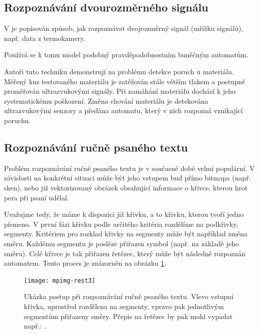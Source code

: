 \documentclass[a4paper,10pt]{article}
\begin{document}
\subsection{Rozpoznávání dvourozměrného signálu}
V \cite{Jin+-WavBasFeaExtUsPrFiStAuPatCla} je popisován způsob, jak rozpoznávat dvojrozměrný signál (mřížku signálů), např. data z termokamery.

Používá se k tomu model podobný pravděpodobnostním buněčným automatům. 

Autoři tuto techniku demonstrují na problému detekce poruch u materiálu. Měřený kus testovaného materiálu je zatěžován stále větším tlakem a postupně proměřován ultrazvukovými signály. Při namáhání materiálu dochází k jeho systematickému poškození. Změna chování materiálu je detekována ultrazvukovými senzory a předána automatu, který v nich rozpozná vznikající poruchu.

\subsection{Rozpoznávání ručně psaného textu} \label{subs:RecHandWrit}
Problém rozpoznávání ručně psaného textu je v současné době velmi populární. V závislosti na konkrétní situaci může být jeho vstupem buď přímo bitmapa (např. sken), nebo již vektorizovaný obrázek obsahující informace o křivce, kterou hrot pera při psaní udělal.

Uvažujme tedy, že máme k dispozici již křivku, a to křivku, kterou tvoří jedno písmeno. V první fázi křivku podle určitého kritéria rozdělíme na podkřivky, segmenty. Kritériem pro rozklad křivky na segmenty může být například změna směru. Každému segmentu je posléze přiřazen symbol (např. na základě jeho směru). Celé křivce je tak přiřazen řetězec, který může být následně rozpoznán automatem. Tento proces je znázorněn na obrázku \ref{img:HandWritEx}.

\begin{figure}
 \texttt{[image: mpimg-rest3]}
 
 \caption[Ukázka postupu při rozpoznávání ručně psaného textu]{Ukázka postup při rozpoznávání ručně psaného textu. Vlevo vstupní křivka, uprostřed rozdělena na segmenty, vpravo pak jednotlivým segmentům přiřazeny směry. Přepis na řetězec by pak mohl vypadat např.:       .}
 \label{img:HandWritEx}
\end{figure}
\end{document}
